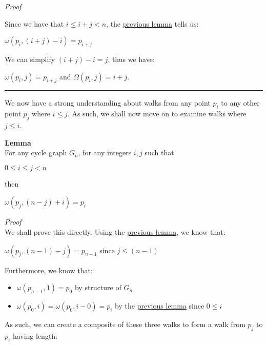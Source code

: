 \documentclass[a4paper,12pt]{article}
\begin{document}
\noindent
\textit{Proof}

\noindent Since we have that $i \leq i + j < n$, the \hyperref[lemma:existence_of_walk_1]{previous lemma} tells us:
\begin{center}
$\omega(p_i, (i + j) - i) = p_{i+j}$
\end{center}

\noindent We can simplify $(i + j) - i = j$, thus we have:
\begin{center}
$\omega(p_i, j) = p_{i+j}$ and 
$\Omega(p_i, j) = i + j$.
\end{center}


\begin{center}
\noindent\rule{8cm}{0.4pt}
\end{center}


\noindent We now have a strong understanding about walks from any point $p_i$ to any other point $p_j$ where $i \leq j$. As such, we shall now move on to examine walks where $j \leq i$.\\

\label{lemma:existence_of_walk_2}
\hypertarget{lemma:existence_of_walk_2}{}
\begin{tcolorbox}
\textbf{Lemma}\\
For any cycle graph $G_n$, for any integers $i, j$ such that
\begin{center}
$0 \leq i \leq j < n$
\end{center}

\noindent then
\begin{center}
$\omega(p_j, (n - j) + i) = p_i$
\end{center}
\end{tcolorbox}

\noindent
\textit{Proof}\\
We shall prove this directly. Using the \hyperref[lemma:existence_of_walk_1]{previous lemma}, we know that:
\begin{center}
$\omega(p_j, (n - 1) - j) = p_{n-1}$ since $j \leq (n - 1)$
\end{center}
Furthermore, we know that:
\begin{itemize}
\item $\omega(p_{n-1}, 1) = p_0$ by structure of $G_n$
\item $\omega(p_0, i) = \omega(p_0, i - 0) = p_i$ by the \hyperref[lemma:existence_of_walk_1]{previous lemma} since $0 \leq i$
\end{itemize}

\noindent As such, we can create a composite of these three walks to form a walk from $p_j$ to $p_i$ having length:
\end{document}
